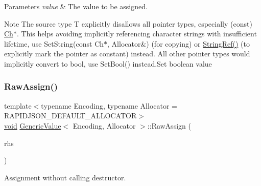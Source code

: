 \begin{DoxyParams}{Parameters}
{\em value} & The value to be assigned.\\
\hline
\end{DoxyParams}
\begin{DoxyNote}{Note}
The source type {\ttfamily T} explicitly disallows all pointer types, especially ({\ttfamily const}) \hyperlink{classGenericValue_ade0e0ce64ccd5d852da57a35e720bafb}{Ch}$\ast$. This helps avoiding implicitly referencing character strings with insufficient lifetime, use Set\+String(const Ch$\ast$, Allocator\&) (for copying) or \hyperlink{document_8h_aa6b9fd9f6aa49405a574c362ba9af6b5}{String\+Ref()} (to explicitly mark the pointer as constant) instead. All other pointer types would implicitly convert to {\ttfamily bool}, use Set\+Bool() instead.\+Set boolean value 
\end{DoxyNote}
\mbox{\label{classGenericValue_abb8ea2dfbe74ff4ee7dac6be31317f81}} 
\subsubsection{\texorpdfstring{Raw\+Assign()}{RawAssign()}}
{\footnotesize\ttfamily template$<$typename Encoding, typename Allocator = R\+A\+P\+I\+D\+J\+S\+O\+N\+\_\+\+D\+E\+F\+A\+U\+L\+T\+\_\+\+A\+L\+L\+O\+C\+A\+T\+OR$>$ \\
\hyperlink{imgui__impl__opengl3__loader_8h_ac668e7cffd9e2e9cfee428b9b2f34fa7}{void} \hyperlink{classGenericValue}{Generic\+Value}$<$ Encoding, Allocator $>$\+::Raw\+Assign (\begin{DoxyParamCaption}\item[{\hyperlink{classGenericValue}{Generic\+Value}$<$ Encoding, Allocator $>$ \&}]{rhs }\end{DoxyParamCaption})\hspace{0.3cm}{\ttfamily [inline]}}



Assignment without calling destructor. 

\mbox{\label{classGenericValue_a8f5f309065479de40a16cf28a340da65}} 
